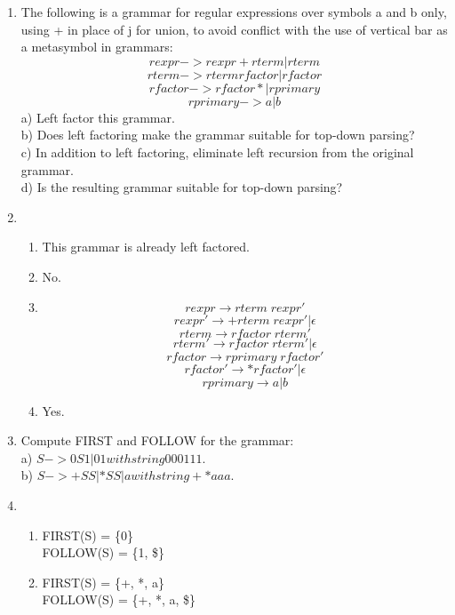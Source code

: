 \documentclass[12pt,a4paper]{article}
\makeatletter
\newtheorem*{solution}{Solution}
\renewenvironment{solution}[1][Solution] {\par\pushQED{\qed}\normalfont\topsep6\p@\@plus6\p@\relax\trivlist\item[\hskip\labelsep\bfseries#1\@addpunct{.}]\ignorespaces}{\popQED\endtrivlist\@endpefalse} \makeatother
\makeatother
\begin{document}
\begin{enumerate}
\item The following is a grammar for regular expressions over symbols a and b only, using + in place of j for union, to avoid conflict with the use
of vertical bar as a metasymbol in grammars:\\
$$rexpr -> rexpr + rterm | rterm$$
$$rterm -> rterm rfactor | rfactor$$
$$rfactor -> rfactor * | rprimary$$
$$rprimary -> a | b$$
a) Left factor this grammar.\\
b) Does left factoring make the grammar suitable for top-down parsing?\\
c) In addition to left factoring, eliminate left recursion from the original grammar.\\
d) Is the resulting grammar suitable for top-down parsing?\\

\begin{solution}
	$   $
	\begin{enumerate}
		\item This grammar is already left factored. \\
		\item No. \\
		\item 
		$$rexpr \to rterm \; rexpr'$$
		$$rexpr' \to +rterm \; rexpr' | \epsilon$$
		$$rterm \to rfactor \; rterm'$$
		$$rterm' \to rfactor \; rterm' | \epsilon$$
 		$$rfactor \to rprimary \; rfactor' $$
		$$rfactor' \to *rfactor' | \epsilon $$
		$$rprimary \to a | b $$
		\item Yes.
	\end{enumerate}
\end{solution}

\item Compute FIRST and FOLLOW for the grammar:\\
a) $S -> 0 S 1 | 0 1 with string 000111$.\\
b) $S -> + S S | * S S | a with string + * aaa$.\\

\begin{solution}
	$   $
	\begin{enumerate}
		\item 
		FIRST(S) = \{0\} \\
		FOLLOW(S) = \{1, \$\} \\
		\item
		FIRST(S) = \{+, *, a\}\\
		FOLLOW(S) = \{+, *, a, \$\}
	\end{enumerate}
\end{solution}
\end{enumerate}
\end{document}
